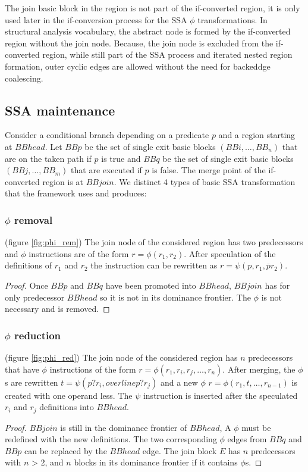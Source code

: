 The join basic block in the region is not part of the if-converted region, it is only used later in the if-conversion process for the SSA $\phi$ transformations. In structural analysis vocabulary, the abstract node is formed by the if-converted region without the join node.
Because, the join node is excluded from the if-converted region, while still part of the SSA process and iterated nested region formation, outer cyclic edges are allowed without the need for backeddge coalescing. 

    \subsection{SSA maintenance}

Consider a conditional branch depending on a predicate $p$ and a region starting at $BBhead$. Let $BBp$ be the set of single exit basic blocks $(BBi,\dots,BB_n)$ that are on the taken path if $p$ is true and $BBq$ be the set of single exit basic blocks $(BBj,\dots,BB_m)$ that are executed if $p$ is false. The merge point of the if-converted region is at $BBjoin$. We distinct 4 types of basic SSA transformation that the framework uses and produces:
\subsubsection{$\phi$ removal} (figure \ref{fig:phi_rem})
The join node of the considered region has two predecessors and $\phi$ instructions are of the form $r=\phi(r_1,r_2)$. After speculation of the definitions of $r_1$ and $r_2$ the instruction can be rewritten as $r=\psi(p,r_1,\overline{p}r_2)$.
\begin{proof} Once $BBp$ and $BBq$ have been promoted into $BBhead$, $BBjoin$ has for only predecessor $BBhead$ so it is not in its dominance frontier. The $\phi$ is not necessary and is removed.
\end{proof}
\subsubsection{$\phi$ reduction} (figure \ref{fig:phi_red})
 The join node of the considered region has $n$ predecessors that have $\phi$ instructions of the form $r=\phi(r_1,r_i,r_j,\dots,r_n)$. After merging, the $\phi$s are rewritten $t=\psi(p?r_i,overline{p}?r_j)$ and a new $\phi$ $r=\phi(r_1,t,\dots,r_{n-1})$ is created with one operand less. The $\psi$ instruction is inserted after the speculated $r_i$ and $r_j$ definitions into $BBhead$.
\begin{proof} $BBjoin$ is still in the dominance frontier of $BBhead$, A $\phi$ must be redefined with the new definitions. The two corresponding $\phi$ edges from $BBq$ and $BBp$ can be replaced by the $BBhead$ edge.
The join block $E$ has $n$ predecessors with $n$ > 2, and $n$ blocks in its dominance frontier if it contains $\phi$s.
\end{proof}
